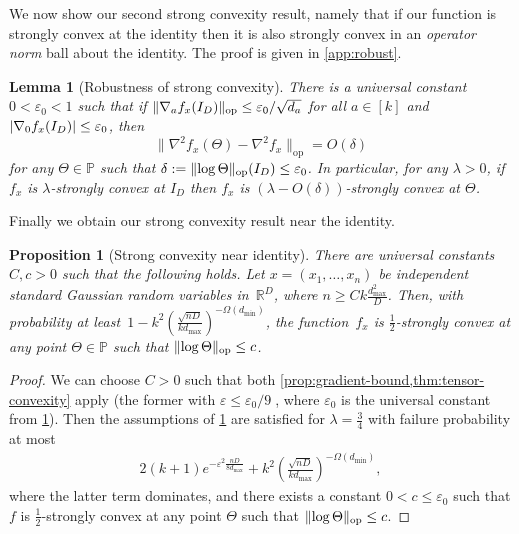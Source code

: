 \documentclass[aos]{imsart}
\newtheorem{prop}[theorem]{Proposition}
\newtheorem{lemma}[theorem]{Lemma}
\theoremstyle{definition}
\numberwithin{equation}{section}
\DeclareMathOperator{\op}{op}
\DeclarePairedDelimiter{\abs}{\lvert}{\rvert}
\DeclarePairedDelimiter{\norm}{\lVert}{\rVert}
\newcommand{\R}{{\mathbb{R}}}
\renewcommand{\P}{{\mathbb{P}}}
\newcommand{\eps}{\varepsilon}
\newcommand{\samp}{x}
\def\dmin{d_{\min}}
\def\dmax{d_{\max}}
\begin{document}
We now show our second strong convexity result, namely that if our function is strongly convex at the identity then it is also strongly convex in an \emph{operator norm} ball about the identity.
The proof is given in \cref{app:robust}.

\begin{lemma}[Robustness of strong convexity]\label{convexRobustness}
There is a universal constant $0 < \eps_0 < 1$ such that if $\norm{\nabla_a f_x(I_D)}_{\op} \leq \eps_0/\sqrt{d_a}$ for all $a\in[k]$ and $\abs{\nabla_{0} f_{\samp}(I_{D})} \leq \eps_0$, then
$$\|\nabla^{2} f_{\samp}(\Theta) - \nabla^{2} f_{\samp}\|_{\op} = O(\delta)$$
for any $\Theta\in\P$ such that $\delta := \norm{\log\Theta}_{\op}(I_D) \leq \eps_0$. In particular, for any $\lambda > 0$, if~$f_x$ is $\lambda$-strongly convex at $I_D$ then $f_x$ is $(\lambda-O(\delta))$-strongly convex at $\Theta$.
\end{lemma}

Finally we obtain our strong convexity result near the identity.

\begin{prop}[Strong convexity near identity]\label{thm:ball-convexity}
There are universal constants $C,c>0$ such that the following holds.
Let $x = (x_1,\dots,x_n)$ be independent standard Gaussian random variables in~$\R^D$, where $n \geq C k \frac{\dmax^2}D$.
Then, with probability at least~$1 - k^2 ( \frac{\sqrt{nD}}{k \dmax} )^{-\Omega(\dmin)}$,
the function~$f_x$ is $\frac12$-strongly convex at any point $\Theta\in\P$ such that $\norm{\log\Theta}_{\op} \leq c$.
\end{prop}
\begin{proof}
We can choose $C>0$ such that both \cref{prop:gradient-bound,thm:tensor-convexity} apply (the former with $\eps\leq\eps_0/9\; $, where $\eps_0$ is the universal constant from \cref{convexRobustness}).
Then the assumptions of \cref{convexRobustness} are satisfied for $\lambda=\frac34$ with failure probability at most
\begin{align*}
  2(k+1)e^{-\eps^2 \frac{nD}{8\dmax}} + k^2 \left( \frac{\sqrt{nD}}{k \dmax} \right)^{-\Omega(\dmin)},
\end{align*}
where the latter term dominates, and there exists a constant $0<c\leq\eps_0$ such that $f$ is $\frac12$-strongly convex at any point $\Theta$ such that $\norm{\log\Theta}_{\op} \leq c$.
\end{proof}
\end{document}
